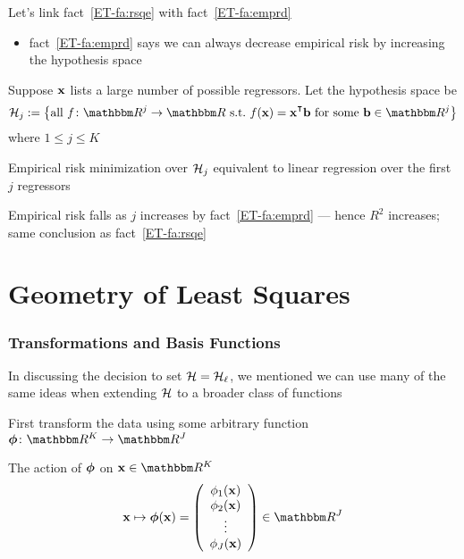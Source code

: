 \begin{frame}
    
    \vspace{2em}
    Let's link
    fact~\ref{ET-fa:rsqe} with
    fact~\ref{ET-fa:emprd}
    \begin{itemize}
        \item fact~\ref{ET-fa:emprd} says we can always decrease empirical risk by 
                increasing the hypothesis space
    \end{itemize}

    \vspace{.7em}
    Suppose  ${\mathbf x}$ lists a large number of possible regressors. Let the
    hypothesis space be
    \begin{equation*}
        \hH_j := 
        \left\{ \text{all } f \colon \RR^j \to \RR \st
                f(\boldx) = \boldx^\T \boldb \text{ for some }
            \boldb \in \RR^j
        \right\}
    \end{equation*}
    where $1 \leq j \leq K$
    
    Empirical risk minimization over $\mathcal H_j$ equivalent to linear regression
    over the first $j$ regressors
    
    Empirical risk falls as $j$ increases by
    fact~\ref{ET-fa:emprd} ---
    hence $R^2$ increases; same conclusion as fact~\ref{ET-fa:rsqe}
    
\end{frame}

\section{Geometry of Least Squares}

\begin{frame}\frametitle{Transformations and Basis Functions}

    \vspace{2em}
    In discussing the decision to set $\mathcal H = \mathcal{H}_{\ell}$, we 
    mentioned we can use many of the same ideas when extending $\mathcal H$ to a
    broader class of functions
    
    First transform the data using
    some arbitrary function $\boldphi \colon \RR^K \to \RR^J$
    
    \vspace{.7em}
    The action of
    ${\boldsymbol \phi}$ on $\boldx \in \RR^K$
    \begin{equation*}
        \boldx \mapsto \boldphi(\boldx)
        =
        \left(
        \begin{array}{c}
            \phi_1(\boldx) \\ 
            \phi_2(\boldx) \\
            \vdots \\
            \phi_J(\boldx)
        \end{array}
        \right) \in \RR^J
    \end{equation*}
    
\end{frame}

